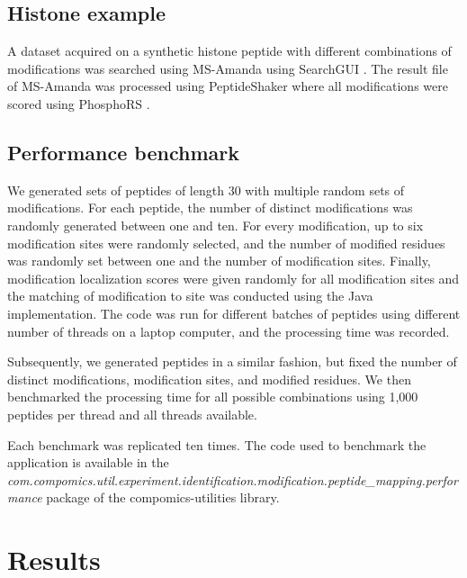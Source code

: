 \documentclass[]{article}
\begin{document}

\subsection{Histone example}

A dataset acquired on a synthetic histone peptide with different combinations of modifications was searched using MS-Amanda \cite{MS_Amanda} using SearchGUI \cite{SearchGUI}. The result file of MS-Amanda was processed using PeptideShaker where all modifications were scored using PhosphoRS \cite{PhosphoRS}.


\subsection{Performance benchmark}

We generated sets of peptides of length 30 with multiple random sets of modifications. For each peptide, the number of distinct modifications was randomly generated between one and ten. For every modification, up to six modification sites were randomly selected, and the number of modified residues was randomly set between one and the number of modification sites. Finally, modification localization scores were given randomly for all modification sites and the matching of modification to site was conducted using the Java implementation. The code was run for different batches of peptides using different number of threads on a laptop computer, and the processing time was recorded. 

Subsequently, we generated peptides in a similar fashion, but fixed the number of distinct modifications, modification sites, and modified residues. We then benchmarked the processing time for all possible combinations using 1,000 peptides per thread and all threads available.

Each benchmark was replicated ten times. The code used to benchmark the application is available in the \textit{com.compomics.util.experiment.identification.modification.peptide\_mapping.performance} package of the compomics-utilities library.


\section{Results}
\end{document}
